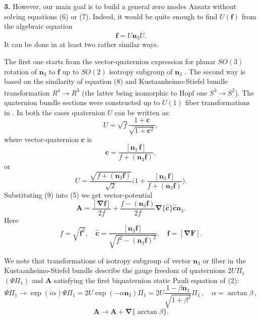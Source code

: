\documentclass[12pt,a4paper]{article}
\begin{document}
{\bf 3.} However, our main goal is to build a general zero modes Ansatz without solving
equations (6) or (7). Indeed,  it would be quite enough to find $U(\mathbf{f})$ from
the algebraic equation
\begin{equation}
\mathbf{f}=U\mathbf{n}_3\overline{U}.
\end{equation}
It can be done in at least two rather similar ways.

The first one starts from the vector-quaternion expression for planar $SO(3)$ rotation of
$\mathbf{n}_3$ to $\mathbf{f}$ up to $SO(2)$ isotropy subgroup of $\mathbf{n}_3$
\cite{Fedorov}. The second way is based on the similarity of equation (8) and
Kustaanheimo-Stiefel bundle transformation $\dot{R^4}\rightarrow \dot{R^3}$
(the latter being isomorphic to Hopf one $S^3\rightarrow S^2$). The quaternion bundle
sections were constructed up to $U(1)$ fiber transformations in \cite{Pris1}.
In both the cases quaternion $U$ can be written as:
\begin{displaymath}
U=\sqrt{f}\frac{1+\mathbf{c}}{\sqrt{1+\mathbf{c}^2}},
\end{displaymath}
where vector-quaternion $\mathbf{c}$ is
\begin{displaymath}
\mathbf{c}=
\frac{[\mathbf{n}_3\, \mathbf{f}]}{f+(\mathbf{n}_3\mathbf{f})},
\end{displaymath}
or
\begin{equation}
U =\frac{\sqrt{f+(\mathbf{n}_3\mathbf{f})}}{\sqrt{2}}\biggl(1+
\frac{[\mathbf{n}_3\, \mathbf{f}]}{f+(\mathbf{n}_3\mathbf{f})}
\biggr).
\end{equation}
Substituting (9) into (5) we get vector-potential
\begin{equation}
\mathbf{A}=\frac{[\mathbf{\nabla}\mathbf{f}]}{2f}+
\frac{f-(\mathbf{n}_3\mathbf{f})}{2f}
\mathbf{\nabla}\{\mathbf{\hat{c}}\}\mathbf{\hat{c}}
\mathbf{n}_3.
\end{equation}
Here
\begin{displaymath}
f=\sqrt{\mathbf{f}^2}, \quad
\mathbf{\hat{c}}=
\frac{[\mathbf{n}_3\mathbf{f}]}{\sqrt{f^2-(\mathbf{n}_3\mathbf{f})^2}}, \quad
\mathbf{f}=[\mathbf{\nabla}\mathbf{F}].
\end{displaymath}

We note that transformations of isotropy subgroup of vector $\mathbf{n}_3$ or fiber in
the Kustaanheimo-Stiefel bundle describe the gauge freedom of quaternions $2U\Pi_1$ $(\Psi \Pi_1)$
and $\mathbf{A}$ satisfying  the first biquaternion static Pauli equation of (2):
$$\Psi \Pi_1 \rightarrow \exp(i\alpha)\Psi \Pi_1=2U\exp(-\alpha \mathbf{n}_3)\Pi_1=
2U\frac{1-\beta \mathbf{n}_3}{\sqrt{1+\beta^2}}\Pi_1 \, ,
\quad \alpha=\arctan \beta \, ,$$
$$\mathbf{A}\rightarrow \mathbf{A}+\mathbf{\nabla}\{\arctan \beta\}.$$
\end{document}
